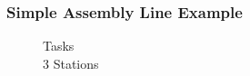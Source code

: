 \documentclass{beamer}
\begin{document}
\begin{frame}
\frametitle{Simple Assembly Line Example}

\begin{figure}
	\centering
	\hspace{5mm}
	\begin{minipage}{0.3\textwidth}
		 Tasks\\
		3 Stations
	\end{minipage}
	\hfill
	\begin{minipage}{0.6\textwidth}
		\centering

\end{minipage}
\end{figure}
\end{frame}
\end{document}
